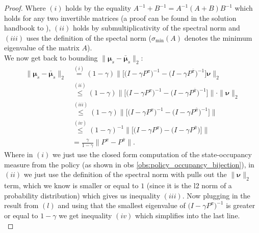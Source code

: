 \begin{proof}
    Where $(i)$ holds by the equality $A^{-1} + B^{-1} = A^{-1} (A+B) B^{-1}$ which holds for any two invertible matrices (a proof can be found in the solution handbook to \cite{searle82}), $(ii)$ holds by submultiplicativity of the spectral norm and $(iii)$ uses the definition of the spectal norm ($\sigma_\text{min}(A)$ denotes the minimum eigenvalue of the matrix $A$). \\

    We now get back to bounding $\| \bm{\mu}_s - \bar{\bm{\mu}}_s \|_2$:
    \begin{align*}
        \| \bm{\mu}_s - \bar{\bm{\mu}}_s \|_2 
        & \stackrel{(i)}{=} 
        (1-\gamma) \Bigg\| \Big[ 
            \big(I-\gamma P^{\pi}\big)^{-1} 
            - \big(I-\gamma P^{\bar{\pi}}\big)^{-1} 
            \Big] \bm{\nu} \Bigg\|_2 \\
        & \stackrel{(ii)}{\leq} 
        (1-\gamma) \Bigg\| \Big[ 
            \big(I-\gamma P^{\pi}\big)^{-1} 
            - \big(I-\gamma P^{\bar{\pi}}\big)^{-1} 
            \Big] \Bigg\| \cdot \| \bm{\nu} \|_2 \\
        & \stackrel{(iii)}{\leq} 
        (1-\gamma) \Bigg\| \Big[ 
            \big(I-\gamma P^{\pi}\big)^{-1} 
            - \big(I-\gamma P^{\bar{\pi}}\big)^{-1} 
            \Big] \Bigg\| \\
        & \stackrel{(iv)}{\leq} 
        (1-\gamma)^{-1} \Bigg\| \Big[ 
            \big(I-\gamma P^{\pi}\big)
            - \big(I-\gamma P^{\bar{\pi}}\big)
            \Big] \Bigg\| \\
        & = \frac{\gamma}{1-\gamma}
        \big\| 
            P^{\pi} -P^{\bar{\pi}}
        \big\|. 
    \end{align*}
    Where in $(i)$ we just use the closed form computation of the state-occupancy measure from the policy (as shown in obs \ref{obs:policy_occupancy_bijection}), in $(ii)$ we just use the definition of the spectral norm with pulls out the $\|\bm{\nu}\|_2$ term, which we know is smaller or equal to $1$ (since it is the l2 norm of a probability distribution) which gives us inequality $(iii)$. Now plugging in the result from $(l)$ and using that the smallest eigenvalue of $\big(I-\gamma P^{\pi}\big)^{-1}$ is greater or equal to $1-\gamma$ we get inequality $(iv)$ which simplifies into the last line.\\


\end{proof}
